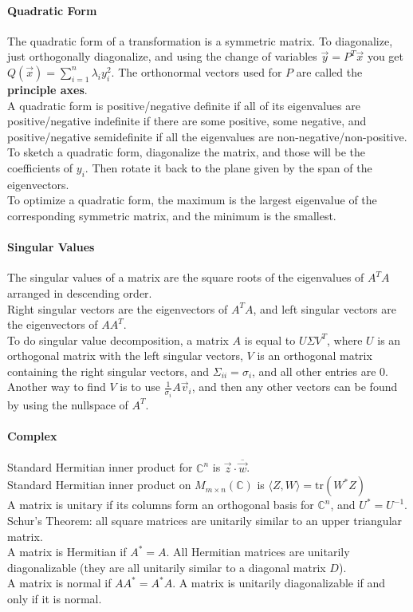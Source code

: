 \documentclass[10pt,letter]{article}
\begin{document}
\paragraph{Quadratic Form}
The quadratic form of a transformation is a symmetric matrix. To diagonalize, just orthogonally diagonalize, and using the change of variables $\vec{y}=P^T\vec{x}$ you get $Q(\vec{x})=\sum_{i=1}^n \lambda_iy_i^2$. The orthonormal vectors used for $P$ are called the \textbf{principle axes}.\\ 
A quadratic form is positive/negative definite if all of its eigenvalues are positive/negative indefinite if there are some positive, some negative, and positive/negative semidefinite if all the eigenvalues are non-negative/non-positive.\\ 
To sketch a quadratic form, diagonalize the matrix, and those will be the coefficients of $y_i$. Then rotate it back to the plane given by the span of the eigenvectors. \\ 
To optimize a quadratic form, the maximum is the largest eigenvalue of the corresponding symmetric matrix, and the minimum is the smallest. 


\paragraph{Singular Values}
The singular values of a matrix are the square roots of the eigenvalues of $A^TA$ arranged in descending order. \\ 
Right singular vectors are the eigenvectors of $A^TA$, and left singular vectors are the eigenvectors of $AA^T$. \\ 
To do singular value decomposition, a matrix $A$ is equal to $U\Sigma V^T$, where $U$ is an orthogonal matrix with the left singular vectors, $V$ is an orthogonal matrix containing the right singular vectors, and $\Sigma_{ii}=\sigma_i$, and all other entries are 0. Another way to find $V$ is to use $\frac{1}{\sigma_i}A\vec{v}_i$, and then any other vectors can be found by using the nullspace of $A^T$. 

\paragraph{Complex}
Standard Hermitian inner product for $\mathbb{C}^n$ is $\vec{z}\cdot\overline{\vec{w}}$. \\ 
Standard Hermitian inner product on $M_{m\times n}(\mathbb{C})$ is $\langle Z,W\rangle=\text{tr}(W^*Z)$\\ 
A matrix is unitary if its columns form an orthogonal basis for $\mathbb{C}^n$, and $U^*=U^{-1}$. \\ 
Schur's Theorem: all square matrices are unitarily similar to an upper triangular matrix. \\ 
A matrix is Hermitian if $A^*=A$. All Hermitian matrices are unitarily diagonalizable (they are all unitarily similar to a diagonal matrix $D$). \\ 
A matrix is normal if $AA^*=A^*A$. A matrix is unitarily diagonalizable if and only if it is normal. \\ 
\end{document}
